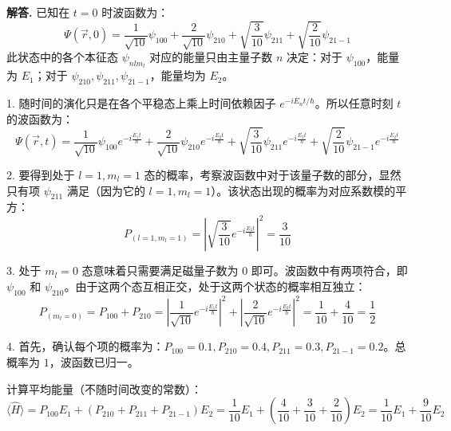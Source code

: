 \documentclass[12pt, a4paper, oneside]{ctexart}
\newenvironment{solution}{\par\noindent\textbf{解答. }}{\par}
\begin{document}
\begin{solution}
    已知在 $t=0$ 时波函数为：
    \begin{equation*}
        \Psi(\vec{r},0) = \frac{1}{\sqrt{10}}\psi_{100} + \frac{2}{\sqrt{10}}\psi_{210} + \sqrt{\frac{3}{10}}\psi_{211} + \sqrt{\frac{2}{10}}\psi_{21-1}
    \end{equation*}
    此状态中的各个本征态 $\psi_{nlm_l}$ 对应的能量只由主量子数 $n$ 决定：对于 $\psi_{100}$，能量为 $E_1$；对于 $\psi_{210}, \psi_{211}, \psi_{21-1}$，能量均为 $E_2$。
    
    1. 随时间的演化只是在各个平稳态上乘上时间依赖因子 $e^{-iE_nt/\hbar}$。所以任意时刻 $t$ 的波函数为：
    \begin{equation*}
        \Psi(\vec{r},t) = \frac{1}{\sqrt{10}}\psi_{100}e^{-i\frac{E_1t}{\hbar}} + \frac{2}{\sqrt{10}}\psi_{210}e^{-i\frac{E_2t}{\hbar}} + \sqrt{\frac{3}{10}}\psi_{211}e^{-i\frac{E_2t}{\hbar}} + \sqrt{\frac{2}{10}}\psi_{21-1}e^{-i\frac{E_2t}{\hbar}}
    \end{equation*}
    
    2. 要得到处于 $l=1, m_l=1$ 态的概率，考察波函数中对于该量子数的部分，显然只有项 $\psi_{211}$ 满足（因为它的 $l=1, m_l=1$）。该状态出现的概率为对应系数模的平方：
    \begin{equation*}
        P_{(l=1,m_l=1)} = \left| \sqrt{\frac{3}{10}} e^{-i\frac{E_2t}{\hbar}} \right|^2 = \frac{3}{10}
    \end{equation*}
    
    3. 处于 $m_l=0$ 态意味着只需要满足磁量子数为 $0$ 即可。波函数中有两项符合，即 $\psi_{100}$ 和 $\psi_{210}$。由于这两个态互相正交，处于这两个状态的概率相互独立：
    \begin{equation*}
        P_{(m_l=0)} = P_{100} + P_{210} = \left| \frac{1}{\sqrt{10}} e^{-i\frac{E_1t}{\hbar}} \right|^2 + \left| \frac{2}{\sqrt{10}} e^{-i\frac{E_2t}{\hbar}} \right|^2 = \frac{1}{10} + \frac{4}{10} = \frac{1}{2}
    \end{equation*}
    
    4. 首先，确认每个项的概率为：$P_{100} = 0.1, P_{210} = 0.4, P_{211} = 0.3, P_{21-1} = 0.2$。总概率为 $1$，波函数已归一。
    
    计算平均能量（不随时间改变的常数）：
    \begin{equation*}
        \langle \hat{H} \rangle = P_{100}E_1 + (P_{210} + P_{211} + P_{21-1})E_2 = \frac{1}{10}E_1 + \left(\frac{4}{10} + \frac{3}{10} + \frac{2}{10}\right)E_2 = \frac{1}{10}E_1 + \frac{9}{10}E_2
    \end{equation*}
    

\end{solution}
\end{document}
